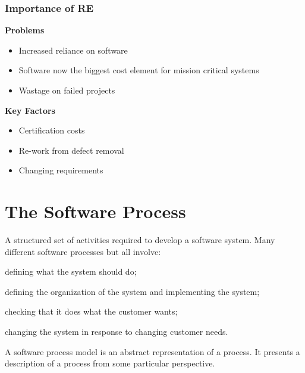 \documentclass{article}
\begin{document}
\subsubsection{Importance of RE}
\vspace{-6pt}
\textbf{Problems}
\vspace{-6pt}
\begin{itemize}
  \setlength\itemsep{-.25em}
  \item Increased reliance on software
  \item Software now the biggest cost element for mission critical systems
  \item Wastage on failed projects
\end{itemize}
\vspace{-6pt}
\textbf{Key Factors}
\vspace{-6pt}
\begin{itemize}
  \setlength\itemsep{-.25em}
  \item Certification costs
  \item Re-work from defect removal
  \item Changing requirements
\end{itemize}

\newpage

\newpage
\section{The Software Process}
A structured set of activities required to develop a software system.\newline
Many different software processes but all involve:
\vspace{-8pt}
\begin{description}
  \setlength\itemsep{-.25em}
  \item [Specification] defining what the system should do;
  \item [Design and implementation] defining the organization of the
system and implementing the system;
  \item [Validation] checking that it does what the customer wants;
  \item [Evolution] changing the system in response to changing
customer needs.
\end{description}
A software process model is an abstract representation of a process. It presents a description of a process from some particular perspective.
\end{document}
